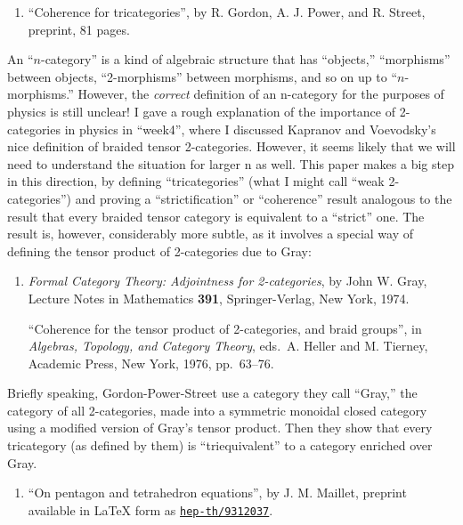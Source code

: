\documentclass{article}
\def\tightlist{}
\begin{document}
\begin{enumerate}
\def\labelenumi{\arabic{enumi})}
\setcounter{enumi}{1}
\tightlist
\item
  ``Coherence for tricategories'', by R. Gordon, A. J. Power, and R.
  Street, preprint, 81 pages.
\end{enumerate}

An ``\(n\)-category'' is a kind of algebraic structure that has
``objects,'' ``morphisms'' between objects, ``2-morphisms'' between
morphisms, and so on up to ``\(n\)-morphisms.'' However, the
\emph{correct} definition of an n-category for the purposes of physics
is still unclear! I gave a rough explanation of the importance of
2-categories in physics in ``week4'', where I discussed Kapranov and
Voevodsky's nice definition of braided tensor 2-categories. However, it
seems likely that we will need to understand the situation for larger n
as well. This paper makes a big step in this direction, by defining
``tricategories'' (what I might call ``weak 2-categories'') and proving
a ``strictification'' or ``coherence'' result analogous to the result
that every braided tensor category is equivalent to a ``strict'' one.
The result is, however, considerably more subtle, as it involves a
special way of defining the tensor product of 2-categories due to Gray:

\begin{enumerate}
\def\labelenumi{\arabic{enumi})}
\setcounter{enumi}{2}
\item
  \emph{Formal Category Theory: Adjointness for 2-categories}, by John
  W. Gray, Lecture Notes in Mathematics \textbf{391}, Springer-Verlag,
  New York, 1974.

  ``Coherence for the tensor product of 2-categories, and braid
  groups'', in \emph{Algebras, Topology, and Category Theory}, eds.~A.
  Heller and M. Tierney, Academic Press, New York, 1976, pp.~63--76.
\end{enumerate}

Briefly speaking, Gordon-Power-Street use a category they call ``Gray,''
the category of all 2-categories, made into a symmetric monoidal closed
category using a modified version of Gray's tensor product. Then they
show that every tricategory (as defined by them) is ``triequivalent'' to
a category enriched over Gray.

\begin{enumerate}
\def\labelenumi{\arabic{enumi})}
\setcounter{enumi}{3}
\tightlist
\item
  ``On pentagon and tetrahedron equations'', by J. M. Maillet, preprint
  available in LaTeX form as
  \href{http://xxx.lanl.gov/abs/hep-th/9312037}{\texttt{hep-th/9312037}}.
\end{enumerate}
\end{document}
